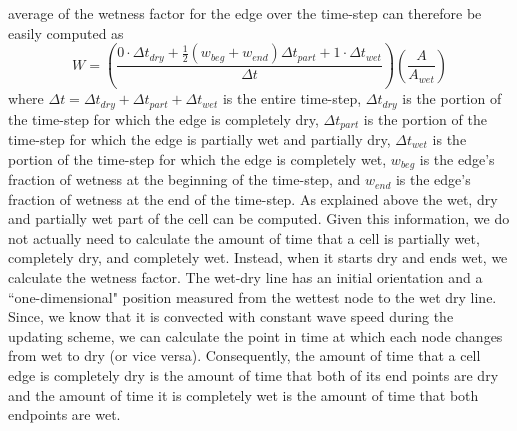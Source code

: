 \documentclass[review]{elsarticle}
\begin{document}
average of the wetness factor for the edge over the time-step can 
therefore be easily computed as
\begin{equation}
        W=\left(\frac{0\cdot\Delta t_{dry} +\frac{1}{2}(w_{beg}+w_{end})\Delta t_{part}+1\cdot\Delta t_{wet}}{\Delta t}\right) \left(\frac{A}{A_{wet}}\right)
        \label{wetnessfactor}
\end{equation}
where $\Delta t=\Delta t_{dry}+\Delta t_{part}+\Delta t_{wet}$ is the 
entire time-step, $\Delta t_{dry}$ is the portion of the time-step for 
which the edge is completely dry, $\Delta t_{part}$ is the portion of 
the time-step for which the edge is partially wet and partially dry, 
$\Delta t_{wet}$ is the portion of the time-step for which the edge is 
completely wet, $w_{beg}$ is the edge's fraction of wetness at the 
beginning of the time-step, and $w_{end}$ is the edge's fraction of 
wetness at the end of the time-step.
As explained above the wet, dry and partially wet part of the cell can be computed.
 Given this information, we do not actually need to calculate the amount of time that a cell is partially wet, completely dry, 
 and completely wet. Instead, when it starts dry and ends wet, we calculate the wetness factor. 
The wet-dry line has an initial orientation and a ``one-dimensional" position measured from the wettest node to the wet dry line. Since, we know that it is convected with constant wave speed  during the updating scheme, we can calculate the point in time at which each node changes from wet to dry (or vice versa). Consequently, the amount of time that a cell edge is completely dry is the amount of time that both of its end points are dry and the amount of time it is completely wet is the amount of time that both  endpoints are wet.
 
\end{document}
